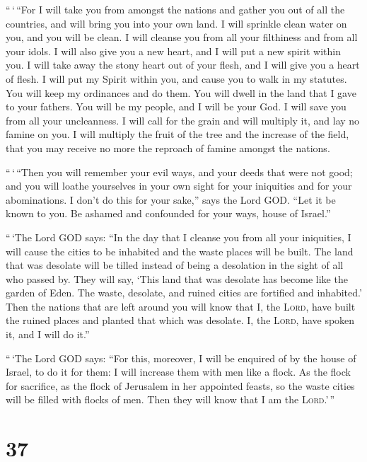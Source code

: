  ``\,`\,``For I will take you from amongst the nations
and gather you out of all the countries, and will bring you into your
own land.  I will sprinkle clean water on you, and you
will be clean. I will cleanse you from all your filthiness and from all
your idols.  I will also give you a new heart, and I will
put a new spirit within you. I will take away the stony heart out of
your flesh, and I will give you a heart of flesh.  I will
put my Spirit within you, and cause you to walk in my statutes. You will
keep my ordinances and do them.  You will dwell in the
land that I gave to your fathers. You will be my people, and I will be
your God.  I will save you from all your uncleanness. I
will call for the grain and will multiply it, and lay no famine on you.
 I will multiply the fruit of the tree and the increase
of the field, that you may receive no more the reproach of famine
amongst the nations.

 ``\,`\,``Then you will remember your evil ways, and your
deeds that were not good; and you will loathe yourselves in your own
sight for your iniquities and for your abominations.  I
don't do this for your sake,'' says the Lord GOD. ``Let it be known to
you. Be ashamed and confounded for your ways, house of Israel.''

 ``\,`The Lord GOD says: ``In the day that I cleanse you
from all your iniquities, I will cause the cities to be inhabited and
the waste places will be built.  The land that was
desolate will be tilled instead of being a desolation in the sight of
all who passed by.  They will say, `This land that was
desolate has become like the garden of Eden. The waste, desolate, and
ruined cities are fortified and inhabited.'  Then the
nations that are left around you will know that I, the \textsc{Lord},
have built the ruined places and planted that which was desolate. I, the
\textsc{Lord}, have spoken it, and I will do it.''

 ``\,`The Lord GOD says: ``For this, moreover, I will be
enquired of by the house of Israel, to do it for them: I will increase
them with men like a flock.  As the flock for sacrifice,
as the flock of Jerusalem in her appointed feasts, so the waste cities
will be filled with flocks of men. Then they will know that I am the
\textsc{Lord}.'\,''

\hypertarget{section-36}{%
\section{37}\label{section-36}}

